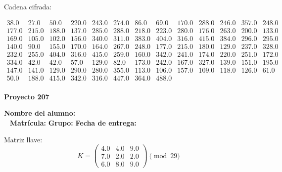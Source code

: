 \documentclass[12pt]{article}
\begin{document}
Cadena cifrada:
\begin{center}
$\begin{array}{lllllllllllll}
38.0 & 27.0 & 50.0 & 220.0 & 243.0 & 274.0 & 86.0 & 69.0 & 170.0 & 288.0 & 246.0 & 357.0 & 248.0\\
177.0 & 215.0 & 188.0 & 137.0 & 285.0 & 288.0 & 218.0 & 223.0 & 280.0 & 176.0 & 263.0 & 200.0 & 133.0\\
169.0 & 105.0 & 102.0 & 156.0 & 340.0 & 311.0 & 383.0 & 404.0 & 316.0 & 415.0 & 384.0 & 296.0 & 295.0\\
140.0 & 90.0 & 155.0 & 170.0 & 164.0 & 267.0 & 248.0 & 177.0 & 215.0 & 180.0 & 129.0 & 237.0 & 328.0\\
232.0 & 255.0 & 404.0 & 316.0 & 415.0 & 259.0 & 160.0 & 342.0 & 241.0 & 174.0 & 220.0 & 251.0 & 172.0\\
334.0 & 42.0 & 42.0 & 57.0 & 129.0 & 82.0 & 173.0 & 242.0 & 167.0 & 327.0 & 139.0 & 151.0 & 195.0\\
147.0 & 141.0 & 129.0 & 290.0 & 280.0 & 355.0 & 113.0 & 106.0 & 157.0 & 109.0 & 118.0 & 126.0 & 61.0\\
50.0 & 188.0 & 415.0 & 342.0 & 316.0 & 447.0 & 364.0 & 488.0\\
\end{array}$
\end{center}

\newpage


\textbf{Proyecto 207}

\textbf{Nombre del alumno:} \underline{\hspace{13cm}}\\\
\vspace{1cm}
\textbf{Matrícula:} \underline{\hspace{4cm}} \hspace{1cm}
\textbf{Grupo:} \underline{\hspace{2cm}}
\textbf{Fecha de entrega:} \underline{\hspace{2cm}}

\medskip

Matriz llave:
\[
K = \begin{pmatrix}
4.0 & 4.0 & 9.0\\
7.0 & 2.0 & 2.0\\
6.0 & 8.0 & 9.0
\end{pmatrix} \pmod{29}
\]
\end{document}
